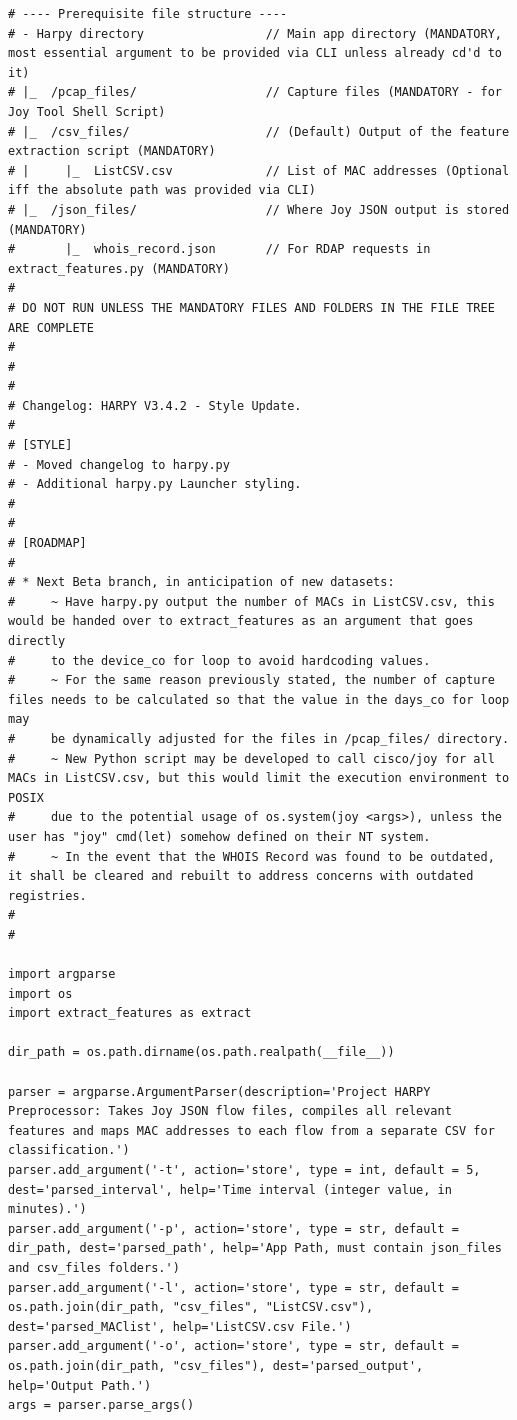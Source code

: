 \documentclass{article}
\begin{document}
\begin{appendices}
\begin{verbatim}
# ---- Prerequisite file structure ----
# - Harpy directory                 // Main app directory (MANDATORY, most essential argument to be provided via CLI unless already cd'd to it)
# |_  /pcap_files/                  // Capture files (MANDATORY - for Joy Tool Shell Script)
# |_  /csv_files/                   // (Default) Output of the feature extraction script (MANDATORY)
# |     |_  ListCSV.csv             // List of MAC addresses (Optional iff the absolute path was provided via CLI)
# |_  /json_files/                  // Where Joy JSON output is stored (MANDATORY)
#       |_  whois_record.json       // For RDAP requests in extract_features.py (MANDATORY)
#
# DO NOT RUN UNLESS THE MANDATORY FILES AND FOLDERS IN THE FILE TREE ARE COMPLETE
#
#
#
# Changelog: HARPY V3.4.2 - Style Update.
#
# [STYLE]
# - Moved changelog to harpy.py
# - Additional harpy.py Launcher styling.
# 
#
# [ROADMAP]
#
# * Next Beta branch, in anticipation of new datasets: 
#     ~ Have harpy.py output the number of MACs in ListCSV.csv, this would be handed over to extract_features as an argument that goes directly
#     to the device_co for loop to avoid hardcoding values.
#     ~ For the same reason previously stated, the number of capture files needs to be calculated so that the value in the days_co for loop may
#     be dynamically adjusted for the files in /pcap_files/ directory.
#     ~ New Python script may be developed to call cisco/joy for all MACs in ListCSV.csv, but this would limit the execution environment to POSIX
#     due to the potential usage of os.system(joy <args>), unless the user has "joy" cmd(let) somehow defined on their NT system.
#     ~ In the event that the WHOIS Record was found to be outdated, it shall be cleared and rebuilt to address concerns with outdated registries.
#
#

import argparse
import os
import extract_features as extract

dir_path = os.path.dirname(os.path.realpath(__file__))

parser = argparse.ArgumentParser(description='Project HARPY Preprocessor: Takes Joy JSON flow files, compiles all relevant features and maps MAC addresses to each flow from a separate CSV for classification.')
parser.add_argument('-t', action='store', type = int, default = 5, dest='parsed_interval', help='Time interval (integer value, in minutes).')
parser.add_argument('-p', action='store', type = str, default = dir_path, dest='parsed_path', help='App Path, must contain json_files and csv_files folders.')
parser.add_argument('-l', action='store', type = str, default = os.path.join(dir_path, "csv_files", "ListCSV.csv"), dest='parsed_MAClist', help='ListCSV.csv File.')
parser.add_argument('-o', action='store', type = str, default = os.path.join(dir_path, "csv_files"), dest='parsed_output', help='Output Path.')
args = parser.parse_args()


\end{verbatim}
\end{appendices}
\end{document}

